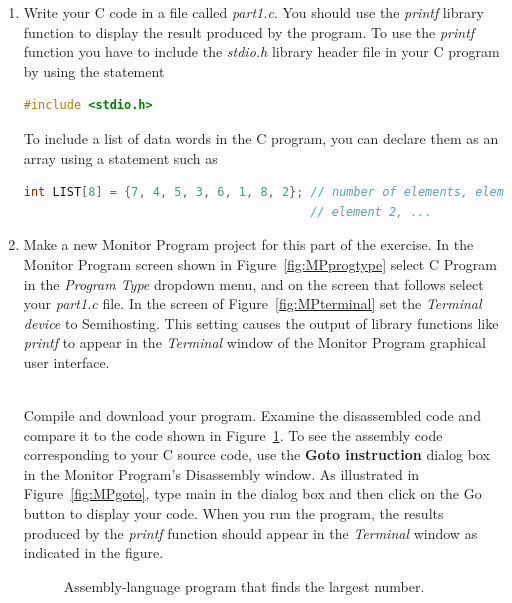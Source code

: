 \documentclass[epsfig,10pt,fullpage]{article}
\begin{document}
\begin{enumerate}
\item
Write your C code in a file called {\it part1.c}.  You should use the {\it printf}
library function to display the result produced by the program. To use the {\it printf} function 
you have to include the {\it stdio.h} library header file in your C program by using the statement

\begin{lstlisting}[language=C]
#include <stdio.h>
\end{lstlisting}

To include a list of data words in the C program, you can declare them as an array using a statement such as

\begin{lstlisting}[language=C]
int LIST[8] = {7, 4, 5, 3, 6, 1, 8, 2}; // number of elements, element 1, 
                                        // element 2, ...
\end{lstlisting}

\item
Make a new Monitor Program project for 
this part of the exercise. In the Monitor Program screen shown in
Figure~\ref{fig:MPprogtype} select {\sf C Program} in the {\it Program Type}
dropdown menu, and on the screen that follows select your {\it part1.c} file. In the screen of 
Figure~\ref{fig:MPterminal} set the {\it Terminal device} to {\sf Semihosting}.
This setting causes the output of library functions like {\it printf} to appear 
in the {\it Terminal} window of the Monitor Program graphical user interface.

~\\
\noindent
Compile and download your program. Examine the disassembled code and compare it
to the code shown in Figure~\ref{fig:code}. To see the assembly code corresponding to your 
C source code, use the {\bf Goto instruction} dialog box in the Monitor Program's Disassembly
window. As illustrated in Figure~\ref{fig:MPgoto}, type {\sf main} in the dialog box and then 
click on the {\sf Go} button to display your code. When you run the program, the results
produced by the {\it printf} function should appear in the {\it Terminal} window as indicated 
in the figure.

\begin{figure}[H]
\begin{center}

\end{center}
\caption{Assembly-language program that finds the largest number.}
\label{fig:code}
\end{figure}


\end{enumerate}
\end{document}
